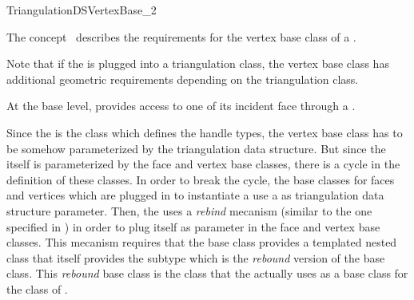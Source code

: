 

\begin{ccRefConcept}{TriangulationDSVertexBase_2}


\ccDefinition
  
The concept \ccRefName\ describes the requirements for the
vertex base class of a .

Note that if  the  
is plugged  into a triangulation class, 
the vertex base class has additional geometric
requirements depending on the triangulation class.

At the base level,  
provides access to one of its incident
face through a .

Since the  is the class 
which defines the handle
types, the vertex base class has to be somehow 
parameterized by the triangulation
data structure.  But since the 
itself is parameterized by the face and vertex
base classes, there is a cycle in the definition of these classes.  
In order
to break the cycle, the base classes for faces and vertices
 which are plugged in to instantiate a
use a  as triangulation
data structure parameter. Then,
the 
uses a {\it rebind}  mecanism (similar to the one specified in
) in order to plug itself 
as parameter in the face and vertex  base classes. 
This mecanism requires that the base class  provides
a templated nested class  that
itself provides 
the subtype 
which is the {\it rebound} version of the base class.
 This {\it rebound} base class is  the class
that the   
 actually  uses  as a base class for the class
of .




\end{ccRefConcept}
